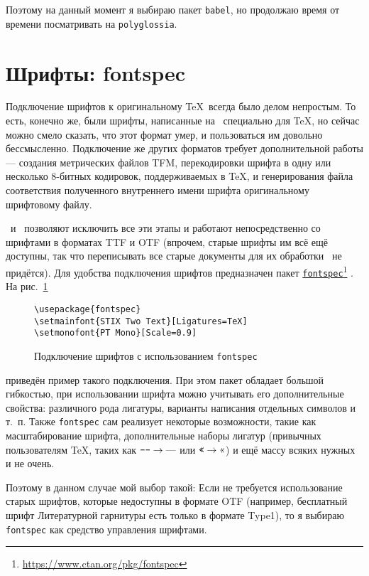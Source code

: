 \documentclass[a4paper,12pt]{article}
\let\orighref=\href
\renewcommand\href[2]{%
  \orighref{#1}{#2}\footnote{\url{#1}}%
}
\begin{document}
Поэтому на данный момент я выбираю пакет \texttt{babel}, но продолжаю время
от времени посматривать на \texttt{polyglossia}.

\section{Шрифты: fontspec}
Подключение шрифтов к оригинальному \TeX\ всегда было делом непростым.
То есть, конечно же, были шрифты, написанные на \METAFONT\ специально для
\TeX, но сейчас можно смело сказать, что этот формат умер, и пользоваться
им довольно бессмысленно. Подключение же других форматов требует
дополнительной работы --- создания метрических файлов TFM, перекодировки
шрифта в одну или несколько 8-битных кодировок, поддерживаемых в \TeX,
и генерирования файла соответствия полученного внутреннего имени шрифта
оригинальному шрифтовому файлу.

\XeTeX\ и \LuaTeX\ позволяют исключить все эти этапы и работают
непосредственно со шрифтами в форматах TTF и OTF (впрочем, старые
шрифты им всё ещё доступны, так что переписывать все старые документы для
их обработки \LuaLaTeX\ не придётся). Для удобства подключения шрифтов
предназначен пакет \href{https://www.ctan.org/pkg/fontspec}{\texttt{fontspec}}.
На рис.~\ref{fontspec1}
\begin{figure}[tp]
\footnotesize
\begin{verbatim}
\usepackage{fontspec}
\setmainfont{STIX Two Text}[Ligatures=TeX]
\setmonofont{PT Mono}[Scale=0.9]
\end{verbatim}
\caption{Подключение шрифтов с использованием
\texttt{fontspec}}\label{fontspec1}
\end{figure}
приведён пример такого подключения. При этом пакет обладает большой
гибкостью, при использовании шрифта можно учитывать его дополнительные
свойства: различного рода лигатуры, варианты написания отдельных
символов и т.~п. Также \texttt{fontspec} сам реализует некоторые
возможности, такие как масштабирование шрифта, дополнительные наборы
лигатур (привычных пользователям \TeX, таких как
$\text{\texttt{---}}\to\text{---}$ или $\text{\texttt{<<}}\to\text{<<}$)
и ещё массу всяких нужных и не очень.

Поэтому в данном случае мой выбор такой: Если не требуется использование
старых шрифтов, которые недоступны в формате OTF (например, бесплатный
шрифт Литературной гарнитуры есть только в формате Type1), то я выбираю
\texttt{fontspec} как средство управления шрифтами.
\end{document}
